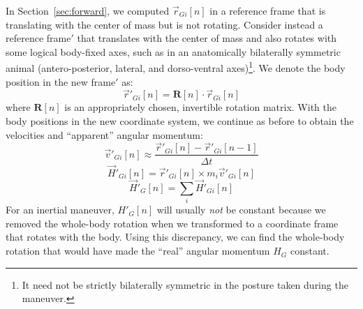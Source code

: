 \documentclass{amsart}
\begin{document}
In Section~\ref{sec:forward}, we computed $\vec{r}_{Gi}[n]$ in a reference frame that is translating with the center of mass but is not rotating.  Consider instead a reference frame$'$ that translates with the center of mass and also rotates with some logical body-fixed axes, such as in an anatomically bilaterally symmetric animal (antero-posterior, lateral, and dorso-ventral axes)\footnote{It need not be strictly bilaterally symmetric in the posture taken during the maneuver.}.  We denote the body position in the new frame$'$ as:
\begin{equation}
\vec{r}'_{Gi}[n] = \mathbf{R}[n] \cdot \vec{r}_{Gi}[n]
\label{eq:rotation}
\end{equation}
where $\mathbf{R}[n]$ is an appropriately chosen, invertible rotation matrix. With the body positions in the new coordinate system, we continue as before to obtain the velocities and ``apparent'' angular momentum:
\begin{equation}
\vec{v}'_{Gi}[n] \approx \frac{\vec{r}'_{Gi}[n] - \vec{r}'_{Gi}[n-1]}{\Delta t}
\end{equation}
\begin{equation}
\vec{H}'_{Gi}[n] = \vec{r}'_{Gi}[n] \times m_i \vec{v}'_{Gi}[n]
\label{eq:fakeH}
\end{equation}
\begin{equation}
\vec{H}'_{G}[n] = \sum_i \vec{H}'_{Gi}[n]
\label{eq:apparent}
\end{equation}
For an inertial maneuver, $H'_G[n]$ will usually \emph{not} be constant because we removed the whole-body rotation when we transformed to a coordinate frame that rotates with the body. Using this discrepancy, we can find the whole-body rotation that would have made the ``real'' angular momentum $H_G$ constant. 
\end{document}
